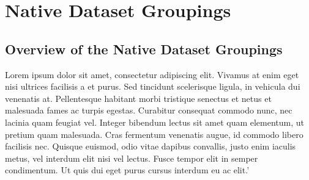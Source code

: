 \pagebreak
\section{Native Dataset Groupings}
\par\vspace{0.5cm}
\subsection{Overview of the Native Dataset Groupings}
Lorem ipsum dolor sit amet, consectetur adipiscing elit. Vivamus at enim eget nisi ultrices facilisis a et purus. Sed tincidunt scelerisque ligula, in vehicula dui venenatis at. Pellentesque habitant morbi tristique senectus et netus et malesuada fames ac turpis egestas. Curabitur consequat commodo nunc, nec lacinia quam feugiat vel. Integer bibendum lectus sit amet quam elementum, ut pretium quam malesuada. Cras fermentum venenatis augue, id commodo libero facilisis nec. Quisque euismod, odio vitae dapibus convallis, justo enim iaculis metus, vel interdum elit nisi vel lectus. Fusce tempor elit in semper condimentum. Ut quis dui eget purus cursus interdum eu ac elit.'
\par\vspace{0.5cm}




